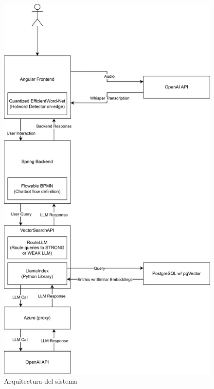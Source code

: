 \documentclass[a4paper,12pt,twoside]{ThesisStyle}
\begin{document}
\begin{figure}[htb]
  \centering
  \includegraphics[width=1\textwidth]{imatges/Full DSO App Architecture.drawio.png}
  \caption{Arquitectura del sistema}
\end{figure}
\end{document}
